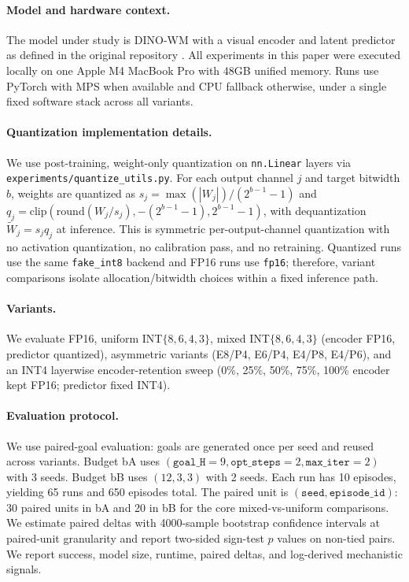 \documentclass{article}
\begin{document}
\paragraph{Model and hardware context.}
The model under study is DINO-WM with a visual encoder and latent predictor as defined in the original repository \citep{zhou2024dinowm}.
All experiments in this paper were executed locally on one Apple M4 MacBook Pro with 48GB unified memory.
Runs use PyTorch with MPS when available and CPU fallback otherwise, under a single fixed software stack across all variants.

\paragraph{Quantization implementation details.}
We use post-training, weight-only quantization on \texttt{nn.Linear} layers via \texttt{experiments/quantize\_utils.py}.
For each output channel $j$ and target bitwidth $b$, weights are quantized as
$s_j=\max(|W_j|)/(2^{b-1}-1)$ and
$q_j=\mathrm{clip}(\mathrm{round}(W_j/s_j),-(2^{b-1}-1),2^{b-1}-1)$,
with dequantization $\tilde{W}_j=s_j q_j$ at inference.
This is symmetric per-output-channel quantization with no activation quantization, no calibration pass, and no retraining.
Quantized runs use the same \texttt{fake\_int8} backend and FP16 runs use \texttt{fp16}; therefore, variant comparisons isolate allocation/bitwidth choices within a fixed inference path.

\paragraph{Variants.}
We evaluate FP16, uniform INT$\{8,6,4,3\}$, mixed INT$\{8,6,4,3\}$ (encoder FP16, predictor quantized), asymmetric variants (E8/P4, E6/P4, E4/P8, E4/P6), and an INT4 layerwise encoder-retention sweep (0\%, 25\%, 50\%, 75\%, 100\% encoder kept FP16; predictor fixed INT4).

\paragraph{Evaluation protocol.}
We use paired-goal evaluation: goals are generated once per seed and reused across variants.
Budget bA uses $(\texttt{goal\_H}=9,\texttt{opt\_steps}=2,\texttt{max\_iter}=2)$ with 3 seeds.
Budget bB uses $(12,3,3)$ with 2 seeds.
Each run has 10 episodes, yielding 65 runs and 650 episodes total.
The paired unit is $(\texttt{seed},\texttt{episode\_id})$: 30 paired units in bA and 20 in bB for the core mixed-vs-uniform comparisons.
We estimate paired deltas with 4000-sample bootstrap confidence intervals at paired-unit granularity and report two-sided sign-test $p$ values on non-tied pairs.
We report success, model size, runtime, paired deltas, and log-derived mechanistic signals.
\end{document}
